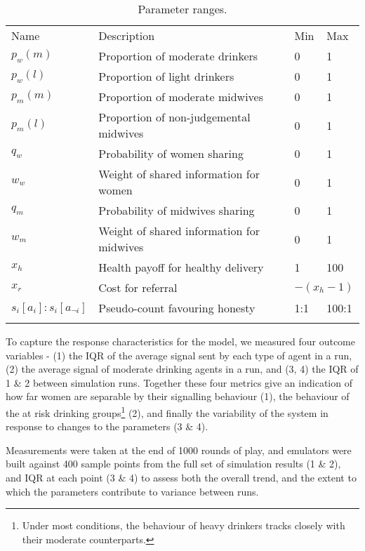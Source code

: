 \begin{table}
\caption{Parameter ranges.}
\label{tab:sa_params}
\begin{tabular} {llll}
\hline\noalign{\smallskip}
Name & Description & Min & Max \\
\noalign{\smallskip}\svhline\noalign{\smallskip}
\(p_{w}(m)\) & Proportion of moderate drinkers & 0 & 1 \\ 
\(p_{w}(l)\) & Proportion of light drinkers & 0 & 1 \\ 
\(p_{m}(m)\) & Proportion of moderate midwives & 0 & 1 \\ 
\(p_{m}(l)\) & Proportion of non-judgemental midwives & 0 & 1 \\ 
\(q_{w}\) & Probability of women sharing & 0 & 1 \\ 
\(w_{w}\) & Weight of shared information for women & 0 & 1 \\ 
\(q_{m}\) & Probability of midwives sharing & 0 & 1 \\ 
\(w_{m}\) & Weight of shared information for midwives & 0 & 1 \\ 
\(x_{h}\) & Health payoff for healthy delivery & 1 & 100 \\ 
\(x_{r}\) & Cost for referral & \multicolumn{2}{l}{\(-(x_{h} - 1)\)} \\ 
\(s_{i}[a_{i}]:s_{i}[a_{\neg i}]\) & Pseudo-count favouring honesty & 1:1 & 100:1 \\
\noalign{\smallskip}\hline\noalign{\smallskip}
\end{tabular}
\end{table}

To capture the response characteristics for the model, we measured four outcome variables - (1) the \ac{IQR} of the average signal sent by each type of agent in a run, (2) the average signal of moderate drinking agents in a run, and (3, 4) the \ac{IQR} of 1 \& 2 between simulation runs. Together these four metrics give an indication of how far women are separable by their signalling behaviour (1), the behaviour of the at risk drinking groups\footnote{Under most conditions, the behaviour of heavy drinkers tracks closely with their moderate counterparts.} (2), and finally the variability of the system in response to changes to the parameters (3 \& 4).

Measurements were taken at the end of 1000 rounds of play, and emulators were built against 400 sample points from the full set of simulation results (1 \& 2), and \ac{IQR} at each point (3 \& 4) to assess both the overall trend, and the extent to which the parameters contribute to variance between runs.

